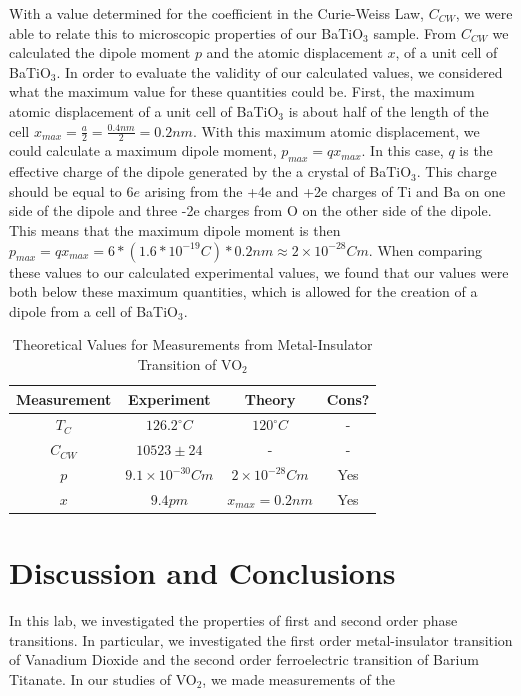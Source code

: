 \documentclass[%
 reprint,
 amsmath,amssymb,
 aps,
 pra,
]{revtex4-1}
\begin{document}
With a value determined for the coefficient in the Curie-Weiss Law, $C_{CW}$, we were able to relate this to microscopic properties of our BaTiO$_{3}$ sample. From $C_{CW}$ we calculated the dipole moment $p$ and the atomic displacement $x$, of a unit cell of BaTiO$_{3}$. In order to evaluate the validity of our calculated values, we considered what the maximum value for these quantities could be. First, the maximum atomic displacement of a unit cell of BaTiO$_{3}$ is about half of the length of the cell $x_{max} = \frac{a}{2} = \frac{0.4nm}{2} = 0.2nm$. With this maximum atomic displacement, we could calculate a maximum dipole moment, $p_{max} = qx_{max}$. In this case, $q$ is the effective charge of the dipole generated by the a crystal of BaTiO$_{3}$. This charge should be equal to $6e$ arising from the +4e and +2e charges of Ti and Ba on one side of the dipole and three -2e charges from O on the other side of the dipole. This means that the maximum dipole moment is then $p_{max} = qx_{max} = 6*(1.6*10^{-19}C)*0.2nm \approx 2 \times 10^{-28}Cm$. When comparing these values to our calculated experimental values, we found that our values were both below these maximum quantities, which is allowed for the creation of a dipole from a cell of BaTiO$_{3}$.

\begin{table}[htbp]
	\begin{center}
		\begin{tabular}{|c|c|c|c|}
			\hline \textbf{Measurement} & \textbf{Experiment} & \textbf{Theory} & \textbf{Cons?}\\
			\hline $T_{C}$ & $126.2^{\circ} C$ & $120^{\circ} C$ & -\\
			\hline $C_{CW}$ & $10523 \pm 24$ & - & - \\
			\hline $p$ & $9.1 \times 10^{-30} Cm$ & $2 \times 10^{-28}Cm$ & Yes\\
			\hline $x$ & $9.4 pm$ &$x_{max} = 0.2 nm$ & Yes\\
			\hline
		\end{tabular}
	\end{center}
	\caption{Theoretical Values for Measurements from Metal-Insulator Transition of VO$_{2}$}
	\label{Tab:BaTiO3Compare}
\end{table}

\section{Discussion and Conclusions}

In this lab, we investigated the properties of first and second order phase transitions. In particular, we investigated the first order metal-insulator transition of Vanadium Dioxide and the second order ferroelectric transition of Barium Titanate. In our studies of VO$_2$, we made measurements of the 
\end{document}
